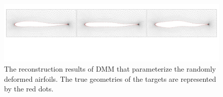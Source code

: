 \begin{figure}[!tb]
    \begin{center}
        \includegraphics[width=1\linewidth]{chapter4/fig/dmm_various_target.pdf}
    \end{center}
    \caption{
        \small The reconstruction results of DMM that parameterize the randomly deformed airfoils. The true geometries of the targets are represented by the red dots.
    }
    \label{ch4:fig:dmm_random_reconstruct}
\end{figure}